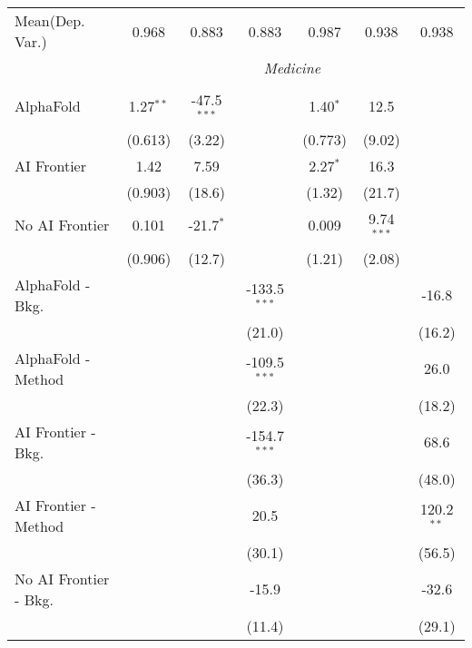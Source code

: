 \begin{tabular}{lcccccc}
Mean(Dep. Var.) & 0.968 & 0.883 & 0.883 & 0.987 & 0.938 & 0.938 \\
 & \multicolumn{6}{c}{\textit{Medicine}} \\ \\
   AlphaFold               & 1.27$^{**}$ & -47.5$^{***}$ &                & 1.40$^{*}$ & 12.5         &   \\   
                           & (0.613)     & (3.22)        &                & (0.773)    & (9.02)       &   \\   
   AI Frontier             & 1.42        & 7.59          &                & 2.27$^{*}$ & 16.3         &   \\   
                           & (0.903)     & (18.6)        &                & (1.32)     & (21.7)       &   \\   
   No AI Frontier          & 0.101       & -21.7$^{*}$   &                & 0.009      & 9.74$^{***}$ &   \\   
                           & (0.906)     & (12.7)        &                & (1.21)     & (2.08)       &   \\   
   AlphaFold - Bkg.        &             &               & -133.5$^{***}$ &            &              & -16.8\\   
                           &             &               & (21.0)         &            &              & (16.2)\\   
   AlphaFold - Method      &             &               & -109.5$^{***}$ &            &              & 26.0\\   
                           &             &               & (22.3)         &            &              & (18.2)\\   
   AI Frontier - Bkg.      &             &               & -154.7$^{***}$ &            &              & 68.6\\   
                           &             &               & (36.3)         &            &              & (48.0)\\   
   AI Frontier - Method    &             &               & 20.5           &            &              & 120.2$^{**}$\\   
                           &             &               & (30.1)         &            &              & (56.5)\\   
   No AI Frontier - Bkg.   &             &               & -15.9          &            &              & -32.6\\   
                           &             &               & (11.4)         &            &              & (29.1)\\   

\end{tabular}
